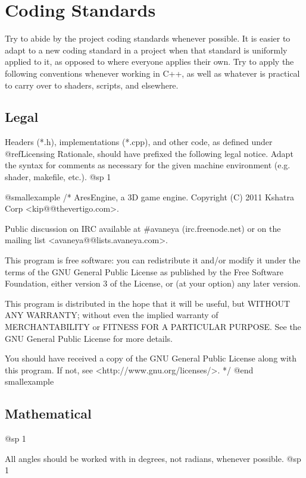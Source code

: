 \section{Coding Standards}

Try to abide by the project coding standards whenever possible. It is easier to adapt to a new coding standard in a project when that standard is uniformly applied to it, as opposed to where everyone applies their own. Try to apply the following conventions whenever working in C++, as well as whatever is practical to carry over to shaders, scripts, and elsewhere.

\subsection{Legal}
Headers (*.h), implementations (*.cpp), and other code, as defined under @ref{Licensing Rationale}, should have prefixed the following legal notice. Adapt the syntax for comments as necessary for the given machine environment (e.g. shader, makefile, etc.).
@sp 1

@smallexample
/*
    AresEngine, a 3D game engine.
    Copyright (C) 2011 Kshatra Corp <kip@@thevertigo.com>.

    Public discussion on IRC available at #avaneya (irc.freenode.net)
    or on the mailing list <avaneya@@lists.avaneya.com>.

    This program is free software: you can redistribute it and/or modify
    it under the terms of the GNU General Public License as published by
    the Free Software Foundation, either version 3 of the License, or
    (at your option) any later version.

    This program is distributed in the hope that it will be useful,
    but WITHOUT ANY WARRANTY; without even the implied warranty of
    MERCHANTABILITY or FITNESS FOR A PARTICULAR PURPOSE.  See the
    GNU General Public License for more details.

    You should have received a copy of the GNU General Public License
    along with this program.  If not, see <http://www.gnu.org/licenses/>.
*/
@end smallexample

\subsection{Mathematical}
@sp 1

\itemize
\item
All angles should be worked with in degrees, not radians, whenever possible.
@sp 1


